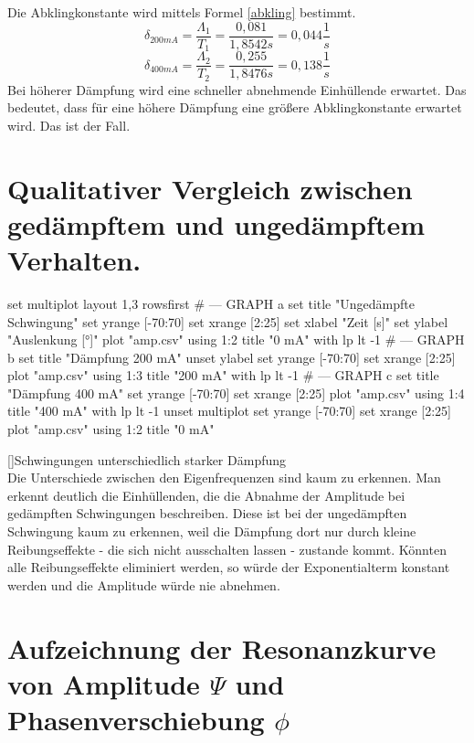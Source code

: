 \documentclass[12pt,a4paper,]{scrreprt}
\begin{document}
        Die Abklingkonstante wird mittels Formel \ref{abkling} bestimmt.
        \begin{equation}
        	\delta_{200mA} = \frac{\Lambda_1}{T_1} = \frac{0,081}{1,8542s} =0,044 \frac{1}{s}
        \end{equation}
        \begin{equation}
        	\delta_{400mA} = \frac{\Lambda_2}{T_2} = \frac{0,255}{1,8476s} =0,138 \frac{1}{s}
        \end{equation}
        Bei höherer Dämpfung wird eine schneller abnehmende Einhüllende erwartet. Das bedeutet, dass für eine höhere Dämpfung eine größere Abklingkonstante erwartet wird. Das ist der Fall.
        
        \section{Qualitativer Vergleich zwischen gedämpftem und ungedämpftem Verhalten.}
    	\begin{gnuplot}[terminal=pdf,terminaloptions={font ",10" linewidth 3},scale=1.2]
        	set multiplot layout 1,3 rowsfirst
			# --- GRAPH a
            set title "Ungedämpfte Schwingung"
            set yrange [-70:70]
        	set xrange [2:25]
            set xlabel "Zeit [s]"
            set ylabel "Auslenkung [°]"
			plot "amp.csv" using 1:2 title "0 mA" with lp lt -1
			# --- GRAPH b
            set title "Dämpfung 200 mA"
            unset ylabel
            set yrange [-70:70]
        	set xrange [2:25]
			plot "amp.csv" using 1:3 title "200 mA" with lp lt -1
			# --- GRAPH c
            set title "Dämpfung 400 mA"
            set yrange [-70:70]
        	set xrange [2:25]
			plot "amp.csv" using 1:4 title "400 mA" with lp lt -1
			unset multiplot
        	set yrange [-70:70]
        	set xrange [2:25]
			plot "amp.csv" using 1:2 title "0 mA"
		\end{gnuplot}
        []{Schwingungen unterschiedlich starker Dämpfung}
        \ \\ Die Unterschiede zwischen den Eigenfrequenzen sind kaum zu erkennen. Man erkennt deutlich die Einhüllenden, die die Abnahme der Amplitude bei gedämpften Schwingungen beschreiben. Diese ist bei der ungedämpften Schwingung kaum zu erkennen, weil die Dämpfung dort nur durch kleine Reibungseffekte - die sich nicht ausschalten lassen - zustande kommt. Könnten alle Reibungseffekte eliminiert werden, so würde der Exponentialterm konstant werden und die Amplitude würde nie abnehmen.
	\section{Aufzeichnung der Resonanzkurve von Amplitude $\Psi$ und Phasenverschiebung $\phi$}
\end{document}
